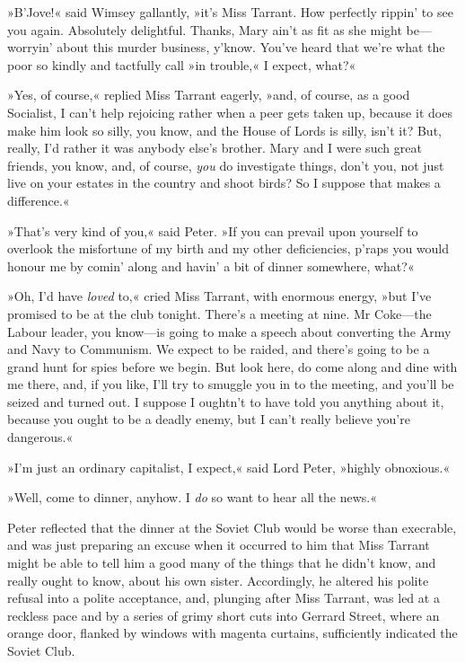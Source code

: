 »B'Jove!« said Wimsey gallantly, »it's Miss Tarrant. How perfectly rippin' to see you again. Absolutely delightful. Thanks, Mary ain't as fit as she might be—worryin' about this murder business, y'know.  You've heard that we're what the poor so kindly and tactfully call »in trouble,« I expect, what?«

»Yes, of course,« replied Miss Tarrant eagerly, »and, of course, as a good Socialist, I can't help rejoicing rather when a peer gets taken up, because it does make him look so silly, you know, and the House of Lords is silly, isn't it? But, really, I'd rather it was anybody else's brother. Mary and I were such great friends, you know, and, of course, \textit{you} do investigate things, don't you, not just live on your estates in the country and shoot birds? So I suppose that makes a difference.«

»That's very kind of you,« said Peter. »If you can prevail upon yourself to overlook the misfortune of my birth and my other deficiencies, p'raps you would honour me by comin' along and havin' a bit of dinner somewhere, what?«

»Oh, I'd have \textit{loved} to,« cried Miss Tarrant, with enormous energy, »but I've promised to be at the club tonight. There's a meeting at nine. Mr Coke—the Labour leader, you know—is going to make a speech about converting the Army and Navy to Communism. We expect to be raided, and there's going to be a grand hunt for spies before we begin.  But look here, do come along and dine with me there, and, if you like, I'll try to smuggle you in to the meeting, and you'll be seized and turned out. I suppose I oughtn't to have told you anything about it, because you ought to be a deadly enemy, but I can't really believe you're dangerous.«

»I'm just an ordinary capitalist, I expect,« said Lord Peter, »highly obnoxious.«

»Well, come to dinner, anyhow. I \textit{do} so want to hear all the news.«

Peter reflected that the dinner at the Soviet Club would be worse than execrable, and was just preparing an excuse when it occurred to him that Miss Tarrant might be able to tell him a good many of the things that he didn't know, and really ought to know, about his own sister.  Accordingly, he altered his polite refusal into a polite acceptance, and, plunging after Miss Tarrant, was led at a reckless pace and by a series of grimy short cuts into Gerrard Street, where an orange door, flanked by windows with magenta curtains, sufficiently indicated the Soviet Club.

